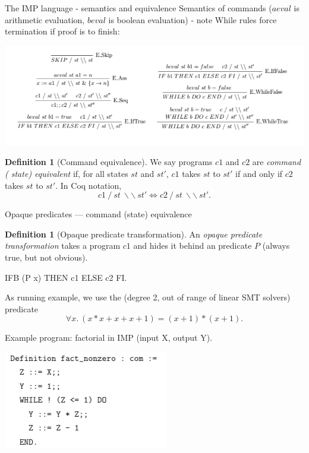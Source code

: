 \documentclass[10pt,handout]{beamer}
\theoremstyle{plain}
\theoremstyle{definition}
\newtheorem{defin}[theo]{Definition}
\begin{document}
\begin{frame}{The IMP language - semantics and equivalence}
Semantics of commands ($aeval$ is arithmetic evaluation, $beval$ is boolean evaluation) - note {\color{red}While rules} force termination if proof is to finish:


\noindent\includegraphics[scale=0.44]{ImpSemantics}
\pause
\begin{defin}[Command equivalence]
We say programs $c1$ and $c2$ are \emph{command ({\color{red} state}) equivalent} if, for all states $st$ and $st'$, $c1$ takes $st$ to $st'$ if and only if $c2$ takes $st$ to $st'$.  In Coq notation,
\[
	c1\ /\ st\ \backslash\backslash\ st' \Leftrightarrow c2\ /\ st\  \backslash\backslash\ st'.
\]
\end{defin}
\end{frame}

\begin{frame}{Opaque predicates --- command (state) equivalence} %
\begin{defin}[Opaque predicate transformation]
An \emph{opaque predicate transformation} takes a program $c1$ and hides it behind an predicate $P$ (always true, but not obvious).
\begin{center}
IFB (P x) THEN c1 ELSE c2 FI.
\end{center} 
\end{defin}

\pause
\begin{example}
As running example, we use the (degree 2, out of range of linear SMT solvers) predicate
\[ \forall x.\ (x * x + x + x + 1) = (x + 1) * (x + 1). \]
\end{example}
 \pause
Example program: {\color{red}factorial} in IMP (input X, output Y).

\includegraphics[scale=0.45]{factorial}
\end{frame}
\end{document}
